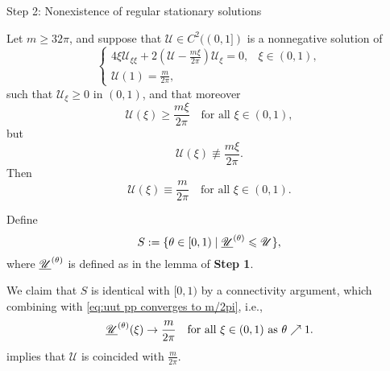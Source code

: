 \begin{frame}{Step 2: Nonexistence of regular stationary solutions}
\begin{lemma}\label{le: constant stationary solution}
	Let $m\geqslant32\pi$, and suppose that $\mathscr U\in C^2((0, 1])$ is a nonnegative solution of
\begin{equation}
	\label{sys: one-point boundary value problem}
	\begin{cases}
		4\xi \mathscr U_{\xi\xi} + 2\left(\mathscr U - \frac{m\xi}{2\pi}\right)\mathscr U_\xi = 0,& \xi\in(0,1),\\
		\mathscr U(1) = \frac{m}{2\pi},
	\end{cases}
\end{equation}
 such that $\mathscr U_\xi\geqslant 0$ in $(0, 1)$, and that moreover
	\begin{equation*}
		\mathscr U(\xi)\geqslant\frac{m\xi}{2\pi} \quad\text{for all } \xi\in(0, 1),
	\end{equation*}
but
	\begin{equation*}
		\mathscr U(\xi)\not\equiv\frac{m\xi}{2\pi}.
	\end{equation*}
Then
	\begin{equation*}
		\mathscr U(\xi) \equiv \frac m{2\pi}\quad\text{for all } \xi\in(0, 1).
	\end{equation*}
\end{lemma}
\end{frame}

\begin{frame}
	Define $$S:=\{\theta\in[0,1)\mid\underline{\mathscr U}^{(\theta)}\leqslant\mathscr U\},$$
	where $\underline{\mathscr U}^{(\theta)}$ is defined as in the lemma of \textbf{Step 1}.

	We claim that $S$ is identical with $[0,1)$ by a connectivity argument, which combining with \eqref{eq:uut pp converges to m/2pi}, i.e.,
\begin{equation*}
  		\underline{\mathscr U}^{(\theta)} (\xi) \rightarrow \frac{m}{2\pi} \quad\text{for all } \xi\in(0, 1) \text{ as } \theta\nearrow 1.
\end{equation*}
 implies that $\mathscr U$ is coincided with $\frac{m}{2\pi}$.

\end{frame}

